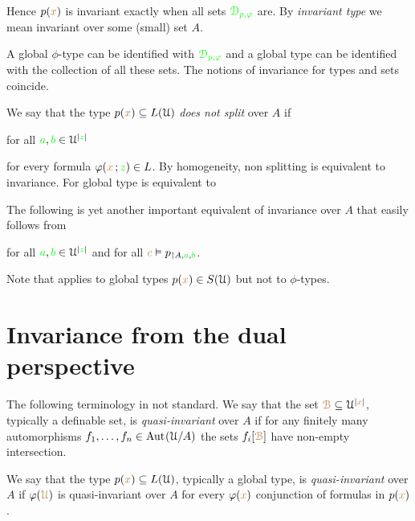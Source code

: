 \documentclass[creche.tex]{subfiles}
\begin{document}
Hence $p({\color{brown} x})$ is invariant exactly when all sets $\color{green}\EuScript D_{p,\varphi}$ are. 
By \emph{invariant type\/} we mean invariant over some (small) set $A$.

A global $\phi$-type can be identified with ${\color{green}\EuScript D_{p,\varphi}}$ and a global type can be identified with the collection of all these sets.
The notions of invariance for types and sets coincide.

We say that the type $p({\color{brown} x})\subseteq L(\EuScript U)$ \emph{does not split\/} over $A$ if

\hfill for all ${\color{green} a},{\color{green} b}\in\EuScript U^{|{\color{green} z}|}$

for every formula $\varphi({\color{brown} x}\,;{\color{green} z})\in L$.
By homogeneity, non splitting is equivalent to invariance.
For global type  is equivalent to


The following is yet another important equivalent of invariance over $A$ that easily follows from 

\hfill for all ${\color{green} a},{\color{green} b}\in\EuScript U^{|{\color{green} z}|}$ and for all ${\color{brown} c}\vDash p_{\restriction A,{\color{green} a},{\color{green} b}}$.

Note that  applies to global types $p({\color{brown} x})\in S(\EuScript U)$ but not to $\phi$-types.

\section{Invariance from the dual perspective}

\noindent\llap{\textcolor{red}{\Large\danger}\kern1.5ex}The following terminology in not standard.
We say that the set ${\color{brown}\EuScript B}\subseteq\EuScript U^{|{\color{brown} x}|}$, typically a definable set, is \emph{quasi-invariant\/} over $A$ if for any finitely many automorphisms $f_1,\dots,f_n\in\textrm{Aut\kern.15ex}(\EuScript U/A)$ the sets $f_i[{\color{brown}\EuScript B}]$ have non-empty intersection.

We say that the type $p({\color{brown} x})\subseteq L(\EuScript U)$, typically a global type, is \emph{quasi-invariant\/} over $A$ if $\varphi({\color{brown}\EuScript U})$ is quasi-invariant over $A$  for every $\varphi({\color{brown} x})$ conjunction of formulas in $p({\color{brown} x})$.
\end{document}
